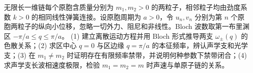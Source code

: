 无限长一维链每个原胞含质量分别为 \(m_1,m_2>0\) 的两粒子，相邻粒子均由劲度系数 \(k>0\) 的相同线性弹簧连接。设原胞周期为 \(a>0\)，令 \(u_n,v_n\) 分别为第 \(n\) 个原胞两粒子的纵向小位移，忽略一切外力、阻尼和非线性。Bloch 波数取第一布里渊区 \(-\pi/a\le q\le\pi/a\)。
(1) 建立离散运动方程并用 Bloch 形式推导两支 \(\omega_\pm(q)\) 的色散关系；(2) 求区中心 \(q=0\) 与区边缘 \(q=\pi/a\) 的本征频率，辨认声学支和光学支；(3) 在 \(m_1\ne m_2\) 时证明存在有限频率禁带，并说明何种参数下禁带闭合；(4) 求声学支长波相速度极限，检验 \(m_1=m_2=m\) 时声速与单原子链的关系。
